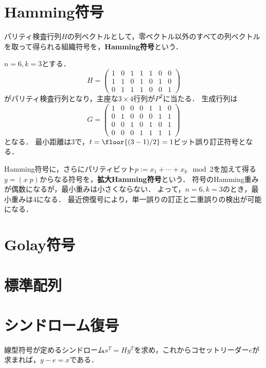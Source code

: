 \documentclass[uplatex,dvipdfmx]{jsreport}
\begin{document}
\section{Hamming符号}

\begin{definition}
    パリティ検査行列$H$の列ベクトルとして，零ベクトル以外のすべての列ベクトルを取って得られる組織符号を，\textbf{Hamming符号}という．
\end{definition}
\begin{example}
    $n=6,k=3$とする．
    \[H=\begin{pmatrix}1&0&1&1&1&0&0\\1&1&0&1&0&1&0\\0&1&1&1&0&0&1\end{pmatrix}\]
    がパリティ検査行列となり，主座な$3\times 4$行列が$P^T$に当たる．
    生成行列は
    \[G=\begin{pmatrix}1&0&0&0&1&1&0\\0&1&0&0&0&1&1\\0&0&1&0&1&0&1\\0&0&0&1&1&1&1\end{pmatrix}\]
    となる．
    最小距離は3で，$t=\floor{(3-1)/2}=1$ビット誤り訂正符号となる．
\end{example}

\begin{definition}
    Hamming符号に，さらにパリティビット$p:=x_1+\cdots+x_k\mod 2$を加えて得る$y=(x\;p)$からなる符号を，\textbf{拡大Hamming符号}という．
    符号のHamming重みが偶数になるが，最小重みは小さくならない．
    よって，$n=6,k=3$のとき，最小重みは4になる．
    最近傍復号により，単一誤りの訂正と二重誤りの検出が可能になる．
\end{definition}

\section{Golay符号}

\section{標準配列}

\section{シンドローム復号}

\begin{tcolorbox}[colframe=ForestGreen, colback=ForestGreen!10!white,breakable,colbacktitle=ForestGreen!40!white,coltitle=black,fonttitle=\bfseries\sffamily,
title=]
    線型符号が定めるシンドローム$s^T=Hy^T$を求め，これからコセットリーダー$e$が求まれば，$y-e=x$である．
\end{tcolorbox}
\end{document}
